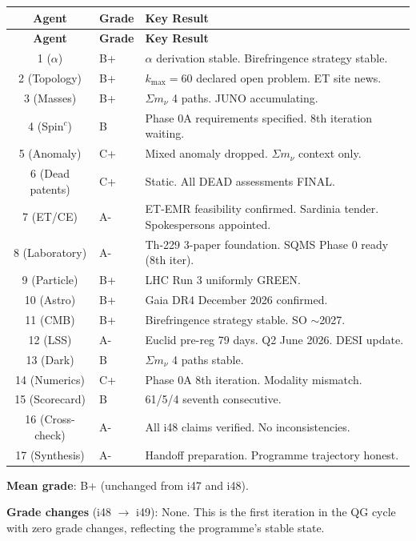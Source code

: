 \documentclass[11pt,a4paper]{article}
\begin{document}
\begin{center}
\begin{longtable}{clp{9cm}}
\toprule
\textbf{Agent} & \textbf{Grade} & \textbf{Key Result} \\
\midrule
\endfirsthead
\toprule
\textbf{Agent} & \textbf{Grade} & \textbf{Key Result} \\
\midrule
\endhead
1 ($\alpha$) & B+ & $\alpha$ derivation stable. Birefringence strategy stable. \\
2 (Topology) & B+ & $k_{\max} = 60$ declared open problem. ET site news. \\
3 (Masses) & B+ & $\Sigma m_\nu$ 4 paths. JUNO accumulating. \\
4 (Spin$^c$) & B & Phase 0A requirements specified. 8th iteration waiting. \\
5 (Anomaly) & C+ & Mixed anomaly dropped. $\Sigma m_\nu$ context only. \\
6 (Dead patents) & C+ & Static. All DEAD assessments FINAL. \\
7 (ET/CE) & A- & ET-EMR feasibility confirmed. Sardinia tender. Spokespersons appointed. \\
8 (Laboratory) & A- & Th-229 3-paper foundation. SQMS Phase 0 ready (8th iter). \\
9 (Particle) & B+ & LHC Run 3 uniformly GREEN. \\
10 (Astro) & B+ & Gaia DR4 December 2026 confirmed. \\
11 (CMB) & B+ & Birefringence strategy stable. SO $\sim$2027. \\
12 (LSS) & A- & Euclid pre-reg 79 days. Q2 June 2026. DESI update. \\
13 (Dark) & B & $\Sigma m_\nu$ 4 paths stable. \\
14 (Numerics) & C+ & Phase 0A 8th iteration. Modality mismatch. \\
15 (Scorecard) & B & 61/5/4 seventh consecutive. \\
16 (Cross-check) & A- & All i48 claims verified. No inconsistencies. \\
17 (Synthesis) & A- & Handoff preparation. Programme trajectory honest. \\
\bottomrule
\end{longtable}
\end{center}

\textbf{Mean grade}: B+ (unchanged from i47 and i48).

\textbf{Grade changes} (i48 $\to$ i49): None. This is the first iteration in the QG cycle with zero grade changes, reflecting the programme's stable state.
\end{document}
